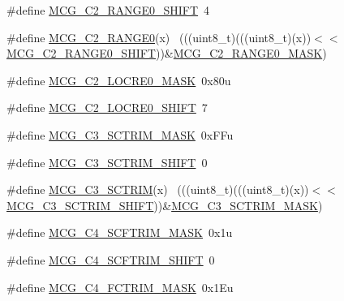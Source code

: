 \begin{DoxyCompactItemize}
\item 
\#define \hyperlink{group___m_c_g___register___masks_gaca9dfaea66978e556c7a9773e2c8c531}{M\+C\+G\+\_\+\+C2\+\_\+\+R\+A\+N\+G\+E0\+\_\+\+S\+H\+I\+FT}~4
\item 
\#define \hyperlink{group___m_c_g___register___masks_ga41d54c406df1619eeea11097d619c6a7}{M\+C\+G\+\_\+\+C2\+\_\+\+R\+A\+N\+G\+E0}(x)                                              ~(((uint8\+\_\+t)(((uint8\+\_\+t)(x))$<$$<$\hyperlink{group___m_c_g___register___masks_gaca9dfaea66978e556c7a9773e2c8c531}{M\+C\+G\+\_\+\+C2\+\_\+\+R\+A\+N\+G\+E0\+\_\+\+S\+H\+I\+FT}))\&\hyperlink{group___m_c_g___register___masks_ga5436f4e93034d8536c23eabcac1b1a43}{M\+C\+G\+\_\+\+C2\+\_\+\+R\+A\+N\+G\+E0\+\_\+\+M\+A\+SK})
\item 
\#define \hyperlink{group___m_c_g___register___masks_gae89f2e48b02a39563115d1a60dc8f16f}{M\+C\+G\+\_\+\+C2\+\_\+\+L\+O\+C\+R\+E0\+\_\+\+M\+A\+SK}~0x80u
\item 
\#define \hyperlink{group___m_c_g___register___masks_gabc900505d9a12bd7a33c2a5e3cfdf02a}{M\+C\+G\+\_\+\+C2\+\_\+\+L\+O\+C\+R\+E0\+\_\+\+S\+H\+I\+FT}~7
\item 
\#define \hyperlink{group___m_c_g___register___masks_ga44433c6372539508fbf3090b591f3d89}{M\+C\+G\+\_\+\+C3\+\_\+\+S\+C\+T\+R\+I\+M\+\_\+\+M\+A\+SK}~0x\+F\+Fu
\item 
\#define \hyperlink{group___m_c_g___register___masks_ga8b5c3c55be188745fefec24b945110b7}{M\+C\+G\+\_\+\+C3\+\_\+\+S\+C\+T\+R\+I\+M\+\_\+\+S\+H\+I\+FT}~0
\item 
\#define \hyperlink{group___m_c_g___register___masks_ga6b77fdc5ccef1d81f2f78baa917b117c}{M\+C\+G\+\_\+\+C3\+\_\+\+S\+C\+T\+R\+IM}(x)                                              ~(((uint8\+\_\+t)(((uint8\+\_\+t)(x))$<$$<$\hyperlink{group___m_c_g___register___masks_ga8b5c3c55be188745fefec24b945110b7}{M\+C\+G\+\_\+\+C3\+\_\+\+S\+C\+T\+R\+I\+M\+\_\+\+S\+H\+I\+FT}))\&\hyperlink{group___m_c_g___register___masks_ga44433c6372539508fbf3090b591f3d89}{M\+C\+G\+\_\+\+C3\+\_\+\+S\+C\+T\+R\+I\+M\+\_\+\+M\+A\+SK})
\item 
\#define \hyperlink{group___m_c_g___register___masks_ga7386e83fdee774ec5d6ec402bae1e432}{M\+C\+G\+\_\+\+C4\+\_\+\+S\+C\+F\+T\+R\+I\+M\+\_\+\+M\+A\+SK}~0x1u
\item 
\#define \hyperlink{group___m_c_g___register___masks_ga1114052674119b01137ef4b4885ab757}{M\+C\+G\+\_\+\+C4\+\_\+\+S\+C\+F\+T\+R\+I\+M\+\_\+\+S\+H\+I\+FT}~0
\item 
\#define \hyperlink{group___m_c_g___register___masks_ga91610035649d14c5027419db0bfa3231}{M\+C\+G\+\_\+\+C4\+\_\+\+F\+C\+T\+R\+I\+M\+\_\+\+M\+A\+SK}~0x1\+Eu

\end{DoxyCompactItemize}
